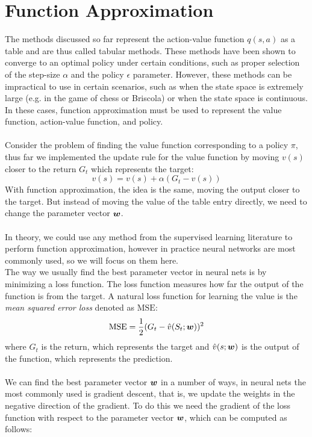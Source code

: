 \section{Function Approximation}
The methods discussed so far represent the action-value function $q(s, a)$ as a table and are thus called tabular methods. These methods have been shown to converge to an optimal policy under certain conditions, such as proper selection of the step-size $\alpha$ and the policy $\epsilon$ parameter. However, these methods can be impractical to use in certain scenarios, such as when the state space is extremely large (e.g. in the game of chess or Briscola) or when the state space is continuous. In these cases, function approximation must be used to represent the value function, action-value function, and policy.\\\\
Consider the problem of finding the value function corresponding to a policy $\pi$, thus far we implemented the update rule for the value function by moving $v(s)$ closer to the return $G_t$ which represents the target:
\begin{equation}
    v(s) = v(s) + \alpha (G_t - v(s))
    \label{eq:tabular-update}
\end{equation}
With function approximation, the idea is the same, moving the output closer to the target. But instead of moving the value of the table entry directly, we need to change the parameter vector $\boldsymbol{w}$.\\\\
In theory, we could use any method from the supervised learning literature to perform function approximation, however in practice neural networks are most commonly used, so we will focus on them here.\\
The way we usually find the best parameter vector in neural nets is by minimizing a loss function. The loss function measures how far the output of the function is from the target. A natural loss function for learning the value is the \textit{mean squared error loss} denoted as $\mathrm{MSE}$:
\begin{equation}
    \mathrm{MSE} = \frac{1}{2}(G_t - \hat{v}(S_t; \boldsymbol{w}))^2
    \label{eq:mse}
\end{equation}
where $G_t$ is the return, which represents the target and $\hat{v}(s; \boldsymbol{w})$ is the output of the function, which represents the prediction.\\\\
We can find the best parameter vector $\boldsymbol{w}$ in a number of ways, in neural nets the most commonly used is gradient descent, that is, we update the weights in the negative direction of the gradient. To do this we need the gradient of the loss function with respect to the parameter vector $\boldsymbol{w}$, which can be computed as follows:
